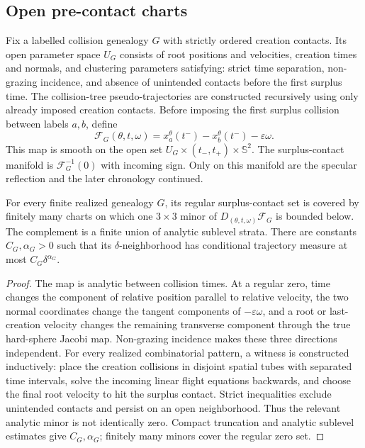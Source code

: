 \subsection{Open pre-contact charts}

Fix a labelled collision genealogy \(G\) with strictly ordered creation
contacts.  Its open parameter space \(U_G\) consists of root positions and
velocities, creation times and normals, and clustering parameters satisfying:
strict time separation, non-grazing incidence, and absence of unintended
contacts before the first surplus time.  The collision-tree pseudo-trajectories
are constructed recursively using only already imposed creation contacts.
Before imposing the first surplus collision between labels \(a,b\), define
\[
 \mathcal F_G(\theta,t,\omega)
 =x_a^\theta(t^-)-x_b^\theta(t^-)-\varepsilon\omega.
\]
This map is smooth on the open set \(U_G\times(t_-,t_+)\times\mathbb S^2\).
The surplus-contact manifold is \(\mathcal F_G^{-1}(0)\) with incoming sign.
Only on this manifold are the specular reflection and the later chronology
continued.

\begin{lemma}
\label{lem:r17-b2-precontact}
For every finite realized genealogy \(G\), its regular surplus-contact set is
covered by finitely many charts on which one \(3\times3\) minor of
\(D_{(\theta,t,\omega)}\mathcal F_G\) is bounded below.  The complement is a
finite union of analytic sublevel strata.  There are constants
\(C_G,\alpha_G>0\) such that its \(\delta\)-neighborhood has conditional
trajectory measure at most \(C_G\delta^{\alpha_G}\).
\end{lemma}

\begin{proof}
The map is analytic between collision times.  At a regular zero, time changes
the component of relative position parallel to relative velocity, the two
normal coordinates change the tangent components of \(-\varepsilon\omega\),
and a root or last-creation velocity changes the remaining transverse
component through the true hard-sphere Jacobi map.  Non-grazing incidence
makes these three directions independent.  For every realized combinatorial
pattern, a witness is constructed inductively: place the creation collisions
in disjoint spatial tubes with separated time intervals, solve the incoming
linear flight equations backwards, and choose the final root velocity to hit
the surplus contact.  Strict inequalities exclude unintended contacts and
persist on an open neighborhood.  Thus the relevant analytic minor is not
identically zero.  Compact truncation and analytic sublevel estimates give
\(C_G,\alpha_G\); finitely many minors cover the regular zero set.
\end{proof}

